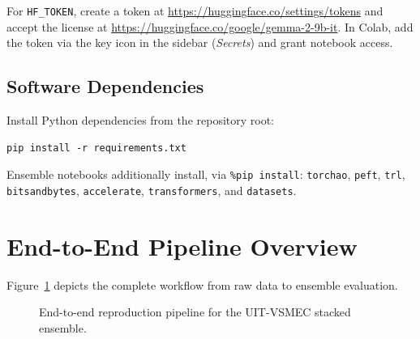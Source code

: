 \documentclass[11pt,a4paper]{article}
\begin{document}
For \texttt{HF\_TOKEN}, create a token at \url{https://huggingface.co/settings/tokens} and accept the license at \url{https://huggingface.co/google/gemma-2-9b-it}. In Colab, add the token via the key icon in the sidebar (\emph{Secrets}) and grant notebook access.

\subsection{Software Dependencies}

Install Python dependencies from the repository root:
\begin{lstlisting}
pip install -r requirements.txt
\end{lstlisting}
Ensemble notebooks additionally install, via \texttt{\%pip install}:
\texttt{torchao}, \texttt{peft}, \texttt{trl}, \texttt{bitsandbytes}, \texttt{accelerate}, \texttt{transformers}, and \texttt{datasets}.

\section{End-to-End Pipeline Overview}
\label{sec:overview}

Figure~\ref{fig:pipeline} depicts the complete workflow from raw data to ensemble evaluation.

\begin{figure}[htbp]
  \centering
  \caption{End-to-end reproduction pipeline for the UIT-VSMEC stacked ensemble.}
  \label{fig:pipeline}
\end{figure}
\end{document}
